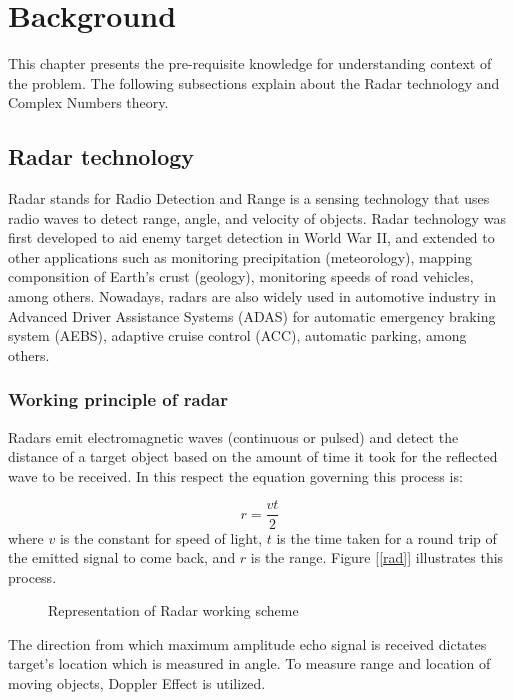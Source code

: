\chapter{Background}\label{chap:comp}

This chapter presents the pre-requisite knowledge for understanding context of the problem. The following subsections explain about the Radar technology and Complex Numbers theory.

\section{Radar technology}
Radar stands for Radio Detection and Range is a sensing technology that uses radio waves to detect range, angle, and velocity of objects. Radar technology was first developed to aid enemy target detection in World War II, and extended to other applications such as monitoring precipitation (meteorology), mapping componsition of Earth's crust (geology), monitoring speeds of road vehicles, among others. Nowadays, radars are also widely used in automotive industry in Advanced Driver Assistance Systems (ADAS) for automatic emergency braking system (AEBS), adaptive cruise control (ACC), automatic parking, among others.

\subsection{Working principle of radar}
Radars emit electromagnetic waves (continuous or pulsed) and detect the distance of a target object based on the amount of time it took for the reflected wave to be received.  In this respect the equation governing this process is:

\begin{equation}\label{dist}
r = \frac{vt}{2} 
\end{equation}
where $v$ is the constant for speed of light, $t$ is the time taken for a round trip of the emitted signal to come back, and $r$ is the range. Figure \ref{[rad]} illustrates this process.

\begin{figure}[htb]
	\centering
	\epsfxsize=5cm
	{}
	\caption{Representation of Radar working scheme}
	\label{fig:rad}
\end{figure}

The direction from which maximum amplitude echo signal is received dictates target’s location which is measured in angle. To measure range and location of moving objects, Doppler Effect is utilized.




